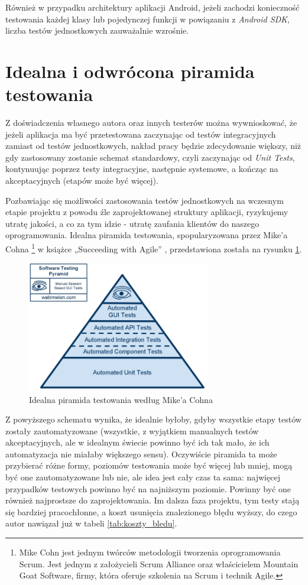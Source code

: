 Również w przypadku architektury aplikacji Android, jeżeli zachodzi konieczność testowania każdej klasy lub pojedynczej funkcji w powiązaniu z \textit{Android SDK}, liczba testów jednostkowych zauważalnie wzrośnie.

\section{Idealna i odwrócona piramida testowania}
\label{piramida_testowania}
Z doświadczenia własnego autora oraz innych testerów można wywnioskować, że jeżeli aplikacja ma być przetestowana zaczynając od testów integracyjnych zamiast od testów jednostkowych, nakład pracy będzie zdecydowanie większy, niż gdy zastosowany zostanie schemat standardowy, czyli zaczynając od \textit{Unit Tests}, kontynuując poprzez testy integracyjne, następnie systemowe, a kończąc na akceptacyjnych (etapów może być więcej). 

Pozbawiając się możliwości zastosowania testów jednostkowych na wczesnym etapie projektu z powodu źle zaprojektowanej struktury aplikacji, ryzykujemy utratę jakości, a co za tym idzie - utratę zaufania klientów do naszego oprogramowania. Idealna piramida testowania, spopularyzowana przez Mike’a Cohna \footnote{Mike Cohn jest jednym twórców metodologii tworzenia oprogramowania Scrum. Jest jednym z założycieli Scrum Alliance oraz właścicielem Mountain Goat Software, firmy, która oferuje szkolenia na Scrum i technik Agile.}  w książce „Succeeding with Agile” \cite{bib:cohn:agile}, przedstawiona została na rysunku \ref{fig:idealna_piramida}.

\begin{figure}[!htb]
    \centering
    \includegraphics[width=8cm]{imgs/ch3_idealna_piramida.png}
    \caption
{Idealna piramida testowania według Mike'a Cohna\cite{bib:cohn:agile}}
    \label{fig:idealna_piramida}
\end{figure} 

\newpage
Z powyższego schematu wynika, że idealnie byłoby, gdyby wszystkie etapy testów zostały zautomatyzowane (wszystkie, z wyjątkiem manualnych testów akceptacyjnych, ale w idealnym świecie powinno być ich tak mało, że ich automatyzacja nie miałaby większego sensu). Oczywiście piramida ta może przybierać różne formy, poziomów testowania może być więcej lub mniej, mogą być one zautomatyzowane lub nie, ale idea jest cały czas ta sama: najwięcej przypadków testowych powinno być na najniższym poziomie. Powinny być one również najprostsze do zaprojektowania. Im dalsza faza projektu, tym testy stają się bardziej pracochłonne, a koszt usunięcia znalezionego błędu wyższy, do czego autor nawiązał już w tabeli \ref{tab:koszty_bledu}.

